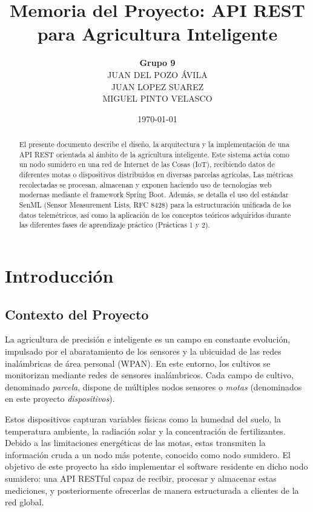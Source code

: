 \documentclass[12pt,a4paper]{article}
\title{\Huge \textbf{Memoria del Proyecto: API REST para Agricultura Inteligente}}
\author{
    \textbf{Grupo 9} \\
    JUAN DEL POZO ÁVILA \\
    JUAN LOPEZ SUAREZ \\
    MIGUEL PINTO VELASCO
}
\date{\today}
\begin{document}
\maketitle
\thispagestyle{empty}

\begin{abstract}
El presente documento describe el diseño, la arquitectura y la implementación de una API REST orientada al ámbito de la agricultura inteligente. Este sistema actúa como un nodo sumidero en una red de Internet de las Cosas (IoT), recibiendo datos de diferentes motas o dispositivos distribuidos en diversas parcelas agrícolas. Las métricas recolectadas se procesan, almacenan y exponen haciendo uso de tecnologías web modernas mediante el framework Spring Boot. Además, se detalla el uso del estándar SenML (Sensor Measurement Lists, RFC 8428) para la estructuración unificada de los datos telemétricos, así como la aplicación de los conceptos teóricos adquiridos durante las diferentes fases de aprendizaje práctico (Prácticas 1 y 2).
\end{abstract}

\newpage
\tableofcontents
\newpage

\section{Introducción}

\subsection{Contexto del Proyecto}
La agricultura de precisión e inteligente es un campo en constante evolución, impulsado por el abaratamiento de los sensores y la ubicuidad de las redes inalámbricas de área personal (WPAN). En este entorno, los cultivos se monitorizan mediante redes de sensores inalámbricos. Cada campo de cultivo, denominado \textit{parcela}, dispone de múltiples nodos sensores o \textit{motas} (denominados en este proyecto \textit{dispositivos}).

Estos dispositivos capturan variables físicas como la humedad del suelo, la temperatura ambiente, la radiación solar y la concentración de fertilizantes. Debido a las limitaciones energéticas de las motas, estas transmiten la información cruda a un nodo más potente, conocido como nodo sumidero. El objetivo de este proyecto ha sido implementar el software residente en dicho nodo sumidero: una API RESTful capaz de recibir, procesar y almacenar estas mediciones, y posteriormente ofrecerlas de manera estructurada a clientes de la red global.
\end{document}
